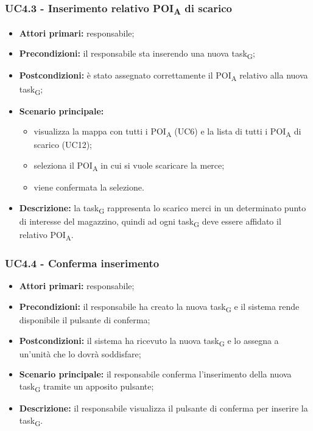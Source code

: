 \subsubsection{UC4.3 - Inserimento relativo POI\textsubscript{A} di scarico}

\begin{itemize}
	\item 	\textbf{Attori primari:} responsabile;
	\item 	\textbf{Precondizioni:} il responsabile sta inserendo una nuova task\textsubscript{G};
	\item 	\textbf{Postcondizioni:} è stato assegnato correttamente il POI\textsubscript{A} relativo alla nuova task\textsubscript{G};
	\item 	\textbf{Scenario principale:}
	\begin{itemize}
		\item visualizza la mappa con tutti i POI\textsubscript{A} (UC6) e la lista di tutti i POI\textsubscript{A} di scarico (UC12);
		\item seleziona il POI\textsubscript{A} in cui si vuole scaricare la merce;
		\item viene confermata la selezione.
	\end{itemize}
	\item 	\textbf{Descrizione:} la task\textsubscript{G} rappresenta lo scarico merci in un determinato punto di interesse del magazzino, quindi ad ogni task\textsubscript{G} deve essere affidato il relativo POI\textsubscript{A}.
\end{itemize}
\subsubsection{UC4.4 - Conferma inserimento}

\begin{itemize}
	\item 	\textbf{Attori primari:} responsabile;
	\item 	\textbf{Precondizioni:} il responsabile ha creato la nuova task\textsubscript{G} e il sistema rende disponibile il pulsante di conferma;
	\item 	\textbf{Postcondizioni:} il sistema ha ricevuto la nuova task\textsubscript{G} e lo assegna a un'unità che lo dovrà soddisfare;
	\item 	\textbf{Scenario principale:} il responsabile conferma l'inserimento della nuova task\textsubscript{G} tramite un apposito pulsante;
	\item 	\textbf{Descrizione:} il responsabile visualizza il pulsante di conferma per inserire la task\textsubscript{G}.
\end{itemize}

